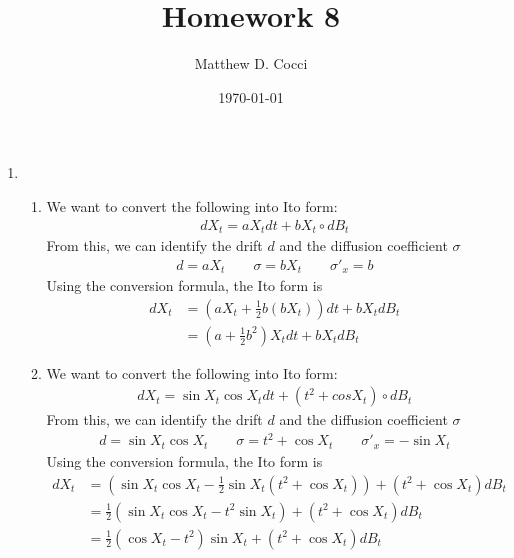 \documentclass[12pt]{article}
\author{Matthew D. Cocci}
\title{Homework 8}
\date{\today}
\theoremstyle{plain}
\theoremstyle{definition}
\theoremstyle{remark}
\begin{document}
\maketitle



\begin{enumerate}
  \item %
    \begin{enumerate}
      \item %
        We want to convert the following into Ito form:
        \begin{align*}
          dX_t = aX_t dt + b X_t \circ dB_t
        \end{align*}
        From this, we can identify the drift $d$ and the diffusion
        coefficient $\sigma$
        \begin{align*}
          d = aX_t \qquad
          \sigma = bX_t \qquad
          \sigma'_x = b
        \end{align*}
        Using the conversion formula, the Ito form is
        \begin{align*}
          dX_t
            &= \left( aX_t + \frac{1}{2} b (bX_t) \right) dt
          + bX_t dB_t \\
          &= \left( a + \frac{1}{2} b^2 \right) X_t dt
            + bX_t dB_t
        \end{align*}

      \item %
        We want to convert the following into Ito form:
        \begin{align*}
          dX_t = \sin X_t \cos X_t dt + (t^2 + cos X_t) \circ dB_t
        \end{align*}
        From this, we can identify the drift $d$ and the diffusion
        coefficient $\sigma$
        \begin{align*}
          d = \sin X_t \cos X_t \qquad
          \sigma = t^2 + \cos X_t \qquad
          \sigma'_x = -\sin X_t
        \end{align*}
        Using the conversion formula, the Ito form is
        \begin{align*}
          dX_t
            &= \left( \sin X_t \cos X_t
            - \frac{1}{2} \sin X_t (t^2 + \cos X_t)\right)
            + (t^2+\cos X_t) dB_t \\
            &= \frac{1}{2} \left( \sin X_t \cos X_t
            - t^2 \sin X_t \right)
            + (t^2+\cos X_t) dB_t \\
            &= \frac{1}{2} \left( \cos X_t
            - t^2  \right) \sin X_t
            + (t^2+\cos X_t) dB_t
        \end{align*}


\end{enumerate}
\end{enumerate}
\end{document}
